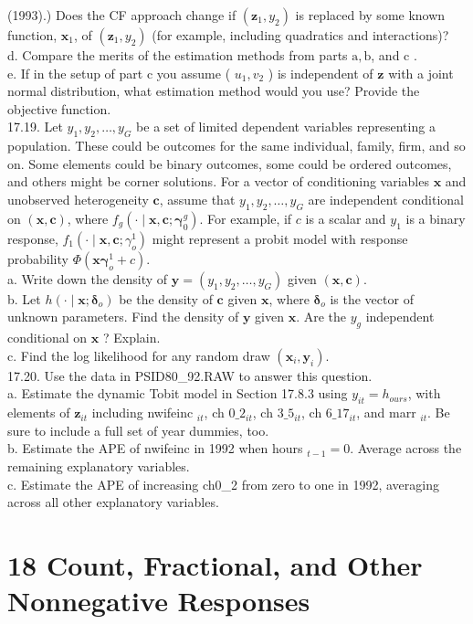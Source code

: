 \documentclass[10pt]{article}
\begin{document}
(1993).) Does the CF approach change if $\left(\mathbf{z}_{1}, y_{2}\right)$ is replaced by some known function, $\mathbf{x}_{1}$, of $\left(\mathbf{z}_{1}, y_{2}\right)$ (for example, including quadratics and interactions)?\\
d. Compare the merits of the estimation methods from parts $\mathrm{a}, \mathrm{b}$, and c .\\
e. If in the setup of part c you assume ( $u_{1}, v_{2}$ ) is independent of $\mathbf{z}$ with a joint normal distribution, what estimation method would you use? Provide the objective function.\\
17.19. Let $y_{1}, y_{2}, \ldots, y_{G}$ be a set of limited dependent variables representing a population. These could be outcomes for the same individual, family, firm, and so on. Some elements could be binary outcomes, some could be ordered outcomes, and others might be corner solutions. For a vector of conditioning variables $\mathbf{x}$ and unobserved heterogeneity $\mathbf{c}$, assume that $y_{1}, y_{2}, \ldots, y_{G}$ are independent conditional on $(\mathbf{x}, \mathbf{c})$, where $f_{g}\left(\cdot \mid \mathbf{x}, \mathbf{c} ; \boldsymbol{\gamma}_{0}^{g}\right)$. For example, if $c$ is a scalar and $y_{1}$ is a binary response, $f_{1}\left(\cdot \mid \mathbf{x}, \mathbf{c} ; \gamma_{o}^{1}\right)$ might represent a probit model with response probability $\Phi\left(\mathbf{x} \boldsymbol{\gamma}_{o}^{1}+c\right)$.\\
a. Write down the density of $\mathbf{y}=\left(y_{1}, y_{2}, \ldots, y_{G}\right)$ given $(\mathbf{x}, \mathbf{c})$.\\
b. Let $h\left(\cdot \mid \mathbf{x} ; \boldsymbol{\delta}_{o}\right)$ be the density of $\mathbf{c}$ given $\mathbf{x}$, where $\boldsymbol{\delta}_{o}$ is the vector of unknown parameters. Find the density of $\mathbf{y}$ given $\mathbf{x}$. Are the $y_{g}$ independent conditional on $\mathbf{x}$ ? Explain.\\
c. Find the log likelihood for any random draw $\left(\mathbf{x}_{i}, \mathbf{y}_{i}\right)$.\\
17.20. Use the data in PSID80\_92.RAW to answer this question.\\
a. Estimate the dynamic Tobit model in Section 17.8.3 using $y_{i t}=h_{o u r s}$, with elements of $\mathbf{z}_{i t}$ including nwifeinc ${ }_{i t}$, ch $0 \_2_{i t}$, ch $3 \_5_{i t}$, ch $6 \_17_{i t}$, and marr ${ }_{i t}$. Be sure to include a full set of year dummies, too.\\
b. Estimate the APE of nwifeinc in 1992 when hours $_{t-1}=0$. Average across the remaining explanatory variables.\\
c. Estimate the APE of increasing ch0\_2 from zero to one in 1992, averaging across all other explanatory variables.

\section*{18 Count, Fractional, and Other Nonnegative Responses}
\end{document}

